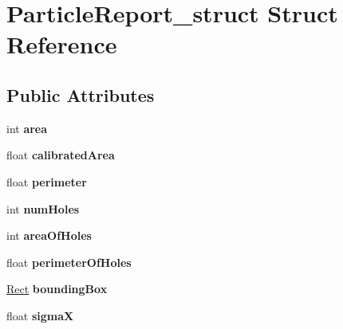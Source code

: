 \hypertarget{structParticleReport__struct}{\section{\-Particle\-Report\-\_\-struct \-Struct \-Reference}
\label{structParticleReport__struct}
}
\subsection*{\-Public \-Attributes}
\begin{DoxyCompactItemize}
\item 
\hypertarget{structParticleReport__struct_a4343228a236d05ea039c72485fe6395a}{int {\bfseries area}}\label{structParticleReport__struct_a4343228a236d05ea039c72485fe6395a}

\item 
\hypertarget{structParticleReport__struct_a798645d0c93f2f8e9c7d5b65ae4c4654}{float {\bfseries calibrated\-Area}}\label{structParticleReport__struct_a798645d0c93f2f8e9c7d5b65ae4c4654}

\item 
\hypertarget{structParticleReport__struct_a490a7e03199b1654fae71bf7d03a6b96}{float {\bfseries perimeter}}\label{structParticleReport__struct_a490a7e03199b1654fae71bf7d03a6b96}

\item 
\hypertarget{structParticleReport__struct_a5b4f9161f8452007dd4cb9161d6689f5}{int {\bfseries num\-Holes}}\label{structParticleReport__struct_a5b4f9161f8452007dd4cb9161d6689f5}

\item 
\hypertarget{structParticleReport__struct_ae3386956cd51c64ee0f1293bef845ed9}{int {\bfseries area\-Of\-Holes}}\label{structParticleReport__struct_ae3386956cd51c64ee0f1293bef845ed9}

\item 
\hypertarget{structParticleReport__struct_a3acbfc7e362cd77490aed22306b95beb}{float {\bfseries perimeter\-Of\-Holes}}\label{structParticleReport__struct_a3acbfc7e362cd77490aed22306b95beb}

\item 
\hypertarget{structParticleReport__struct_a0810946e7b3f564eed28a9609d7e541e}{\hyperlink{structRect__struct}{\-Rect} {\bfseries bounding\-Box}}\label{structParticleReport__struct_a0810946e7b3f564eed28a9609d7e541e}

\item 
\hypertarget{structParticleReport__struct_af4169fd9ba426d6c40f884f078cfe960}{float {\bfseries sigma\-X}}\label{structParticleReport__struct_af4169fd9ba426d6c40f884f078cfe960}


\end{DoxyCompactItemize}
